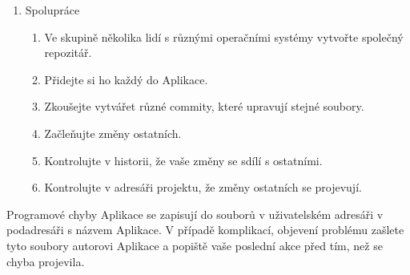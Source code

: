 \begin{enumerate}
\begin{enumerate}
	\end{enumerate}
	\item Spolupráce
	\begin{enumerate}
		\item Ve skupině několika lidí s různými operačními systémy vytvořte společný repozitář.
		\item Přidejte si ho každý do Aplikace.
		\item Zkoušejte vytvářet různé commity, které upravují stejné soubory.
		\item Začleňujte změny ostatních.
		\item Kontrolujte v historii, že vaše změny se sdílí s ostatními.
		\item Kontrolujte v adresáři projektu, že změny ostatních se projevují.
	\end{enumerate}
\end{enumerate}

Programové chyby Aplikace se zapisují do souborů v uživatelském adresáři v podadresáři s názvem Aplikace. V případě komplikací, objevení problému zašlete tyto soubory autorovi Aplikace a popiště vaše poslední akce před tím, než se chyba projevila.